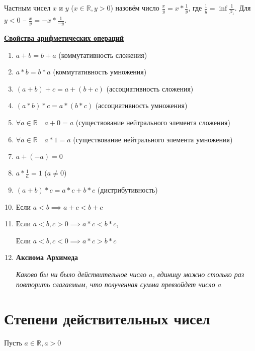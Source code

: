 \documentclass{article}
\newcommand{\parspace}{\vspace{10pt}}
\begin{document}
Частным чисел $x$ и $y$ ($x \in \mathbb{R}, y > 0$) назовём число 
$\frac{x}{y} = x * \frac{1}{y}$, где $\frac{1}{y} = \inf \frac{1}{\beta_1}$.
Для $y < 0$ -- $\frac{x}{y} = -x * \frac{1}{-y}$.

\parspace

\underline{\textbf{Свойства арифметических операций}}
\begin{enumerate}
    \item $a + b = b + a$ (коммутативность сложения)
    \item $a * b = b * a$ (коммутативность умножения)
    \item $(a + b) + c = a + (b + c)$ (ассоциативность сложения)
    \item $(a * b) * c = a * (b * c)$ (ассоциативность умножения)
    \item $\forall a \in \mathbb{R} \quad a + 0 = a$ 
    (существование нейтрального элемента сложения)
    \item $\forall a \in \mathbb{R} \quad a * 1 = a$
    (существование нейтрального элемента умножения)
    \item $a + (-a) = 0$
    \item $a * \frac{1}{a} = 1$ ($a \neq 0$)
    \item $(a + b) * c = a * c + b * c$ (дистрибутивность)
    \item Если $a < b \implies a + c < b + c$
    \item Если $a < b, c > 0 \implies a * c < b * c$,
    
    Если $a < b, c < 0 \implies a * c > b * c$
    \item \textbf{Аксиома Архимеда}
    
    \textit{Каково бы ни было действительное число $a$, единицу можно столько
    раз повторить слагаемым, что полученная сумма превзойдет число $a$}
\end{enumerate}

\section{Степени действительных чисел}

Пусть $a \in \mathbb{R}, a > 0$
\end{document}
